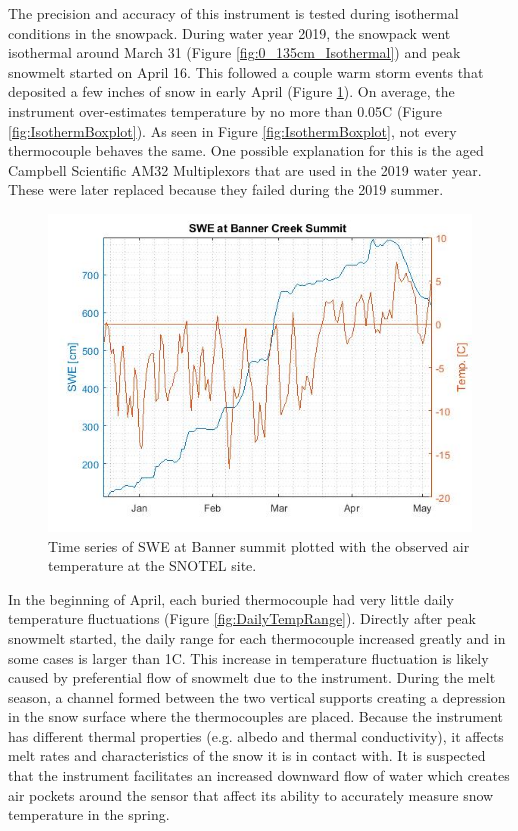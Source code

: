 The precision and accuracy of this instrument is tested during isothermal conditions in the snowpack. During water year 2019, the snowpack went isothermal around March 31 (Figure \ref{fig:0_135cm_Isothermal}) and peak snowmelt started on April 16. This followed a couple warm storm events that deposited a few inches of snow in early April (Figure \ref{fig:SWE_SNTLTemp}). On average, the instrument over-estimates temperature by no more than 0.05\textdegree C (Figure \ref{fig:IsothermBoxplot}). As seen in Figure \ref{fig:IsothermBoxplot}, not every thermocouple behaves the same. One possible explanation for this is the aged Campbell Scientific AM32 Multiplexors that are used in the 2019 water year. These were later replaced because they failed during the 2019 summer.  
 
\begin{figure}[H]
    \centering
    \includegraphics[width=0.7\linewidth]{figures/SWE_SNTLTemp.jpg}
    \caption{Time series of SWE at Banner summit plotted with the observed air temperature at the SNOTEL site.}
    \label{fig:SWE_SNTLTemp}
\end{figure}

In the beginning of April, each buried thermocouple had very little daily temperature fluctuations (Figure \ref{fig:DailyTempRange}). Directly after peak snowmelt started, the daily range for each thermocouple increased greatly and in some cases is larger than 1\textdegree C. This increase in temperature fluctuation is likely caused by preferential flow of snowmelt due to the instrument. During the melt season, a channel formed between the two vertical supports creating a depression in the snow surface where the thermocouples are placed. Because the instrument has different thermal properties (e.g. albedo and thermal conductivity), it affects melt rates and characteristics of the snow it is in contact with. It is suspected that the instrument facilitates an increased downward flow of water which creates air pockets around the sensor that affect its ability to accurately measure snow temperature in the spring. 

